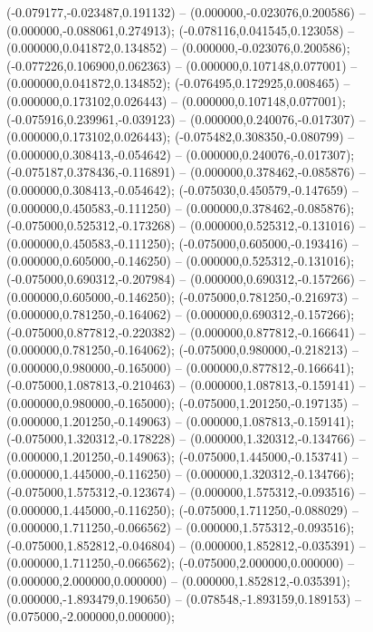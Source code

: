  (-0.079177,-0.023487,0.191132) -- (0.000000,-0.023076,0.200586) -- (0.000000,-0.088061,0.274913);
 (-0.078116,0.041545,0.123058) -- (0.000000,0.041872,0.134852) -- (0.000000,-0.023076,0.200586);
 (-0.077226,0.106900,0.062363) -- (0.000000,0.107148,0.077001) -- (0.000000,0.041872,0.134852);
 (-0.076495,0.172925,0.008465) -- (0.000000,0.173102,0.026443) -- (0.000000,0.107148,0.077001);
 (-0.075916,0.239961,-0.039123) -- (0.000000,0.240076,-0.017307) -- (0.000000,0.173102,0.026443);
 (-0.075482,0.308350,-0.080799) -- (0.000000,0.308413,-0.054642) -- (0.000000,0.240076,-0.017307);
 (-0.075187,0.378436,-0.116891) -- (0.000000,0.378462,-0.085876) -- (0.000000,0.308413,-0.054642);
 (-0.075030,0.450579,-0.147659) -- (0.000000,0.450583,-0.111250) -- (0.000000,0.378462,-0.085876);
 (-0.075000,0.525312,-0.173268) -- (0.000000,0.525312,-0.131016) -- (0.000000,0.450583,-0.111250);
 (-0.075000,0.605000,-0.193416) -- (0.000000,0.605000,-0.146250) -- (0.000000,0.525312,-0.131016);
 (-0.075000,0.690312,-0.207984) -- (0.000000,0.690312,-0.157266) -- (0.000000,0.605000,-0.146250);
 (-0.075000,0.781250,-0.216973) -- (0.000000,0.781250,-0.164062) -- (0.000000,0.690312,-0.157266);
 (-0.075000,0.877812,-0.220382) -- (0.000000,0.877812,-0.166641) -- (0.000000,0.781250,-0.164062);
 (-0.075000,0.980000,-0.218213) -- (0.000000,0.980000,-0.165000) -- (0.000000,0.877812,-0.166641);
 (-0.075000,1.087813,-0.210463) -- (0.000000,1.087813,-0.159141) -- (0.000000,0.980000,-0.165000);
 (-0.075000,1.201250,-0.197135) -- (0.000000,1.201250,-0.149063) -- (0.000000,1.087813,-0.159141);
 (-0.075000,1.320312,-0.178228) -- (0.000000,1.320312,-0.134766) -- (0.000000,1.201250,-0.149063);
 (-0.075000,1.445000,-0.153741) -- (0.000000,1.445000,-0.116250) -- (0.000000,1.320312,-0.134766);
 (-0.075000,1.575312,-0.123674) -- (0.000000,1.575312,-0.093516) -- (0.000000,1.445000,-0.116250);
 (-0.075000,1.711250,-0.088029) -- (0.000000,1.711250,-0.066562) -- (0.000000,1.575312,-0.093516);
 (-0.075000,1.852812,-0.046804) -- (0.000000,1.852812,-0.035391) -- (0.000000,1.711250,-0.066562);
 (-0.075000,2.000000,0.000000) -- (0.000000,2.000000,0.000000) -- (0.000000,1.852812,-0.035391);
 (0.000000,-1.893479,0.190650) -- (0.078548,-1.893159,0.189153) -- (0.075000,-2.000000,0.000000);
